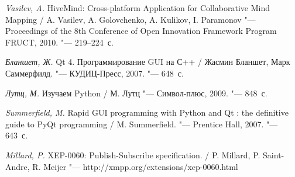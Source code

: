 \newpage
{}
\begin{thebibliography}{99}

\textit {Vasilev, A.}
HiveMind: Cross-platform Application for Collaborative Mind Mapping
/ A. Vasilev, A. Golovchenko, A. Kulikov, I. Paramonov
"--- Proceedings of the 8th Conference of Open Innovation Framework Program
FRUCT, 2010.
"---  219--224~с.

\textit {Бланшет, Ж.} Qt 4. Программирование GUI на С++
/ Жасмин Бланшет, Марк Саммерфилд.
"--- КУДИЦ-Пресс, 2007.
"--- 648~с.

\textit {Лутц, М.} Изучаем Python
/ М. Лутц
"--- Символ-плюс, 2009.
"--- 848~с.

\textit {Summerfield, M.} Rapid GUI programming with Python and Qt : the
definitive guide to PyQt programming
/ M. Summerfield.
"--- Prentice Hall, 2007.
"--- 643~с.

\textit {Millard, P.}  XEP-0060: Publish-Subscribe specification.
/ P. Millard, P. Saint-Andre, R. Meijer
"---  http://xmpp.org/extensions/xep-0060.html

\end{thebibliography}
